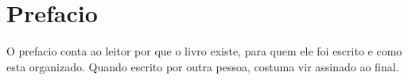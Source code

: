 %

\chapter*{Prefacio}

O prefacio conta ao leitor por que o livro existe, para quem ele foi escrito e
como esta organizado. Quando escrito por outra pessoa, costuma vir assinado ao
final.

\vspace{1em}
\begin{flushright}
  \textit{\lkAuthor}\\
  \lkIfCity{\lkCity, }{}\lkYear
\end{flushright}
